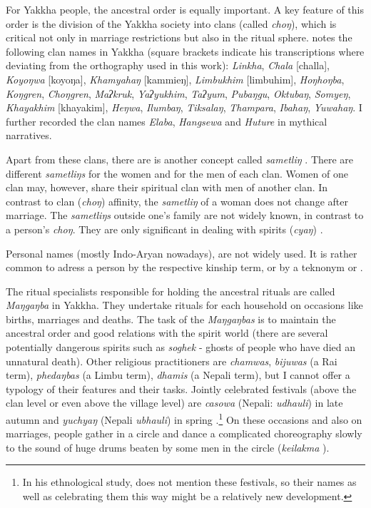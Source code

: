 For  Yakkha people, the ancestral order is equally important. A key feature of this order is the division of the Yakkha society into clans (called \emph{choŋ}), which is critical not only in marriage restrictions but also in the ritual sphere. \citet[201]{Russell1992_Yakha} notes the following clan names in Yakkha (square brackets indicate his transcriptions where deviating from the orthography used in this work): \emph{Linkha}, \emph{Chala} [challa], \emph{Koyoŋwa} [koyoŋa], \emph{Khamyahaŋ} [kammieŋ], \emph{Limbukhim} [limbuhim], \emph{Hoŋhoŋba}, \emph{Koŋgren}, \emph{Choŋgren}, \emph{Maʔkruk}, \emph{Yaʔyukhim}, \emph{Taʔyum}, \emph{Pubaŋgu}, \emph{Oktubaŋ}, \emph{Somyeŋ}, \emph{Khayakhim} [khayakim], \emph{Heŋwa}, \emph{Ilumbaŋ}, \emph{Tiksalaŋ}, \emph{Thampara}, \emph{Ibahaŋ}, \emph{Yuwahaŋ}. I further recorded the clan names \emph{Elaba}, \emph{Hangsewa} and \emph{Huture} in mythical narratives. 

Apart from these clans, there are is another concept called \emph{sametliŋ} . There are different  \emph{sametliŋs} for the women and for the men of each clan. Women of one clan may, however, share their spiritual clan with men of another clan. In contrast to clan  (\emph{choŋ}) affinity, the \emph{sametliŋ} of a woman does not change after marriage. The \emph{sametliŋs} outside one's family are not widely known, in contrast to a person's \emph{choŋ}. They are only significant in dealing with spirits (\emph{cyaŋ}) \citep[166]{Russell1992_Yakha}.

Personal names (mostly Indo-Aryan nowadays), are not widely used. It is rather common to adress a person by the respective kinship term, or by a teknonym  or . 

The ritual specialists responsible for holding the ancestral rituals are called \emph{Maŋgaŋba} in Yakkha. They undertake rituals for each household on occasions like births, marriages and deaths. The task of the \emph{Maŋgaŋbas} is to maintain the ancestral order and good relations with the spirit world (there are several potentially dangerous spirits such as \emph{soghek} - ghosts of people who have died an unnatural death). Other religious practitioners are \emph{chamwas},  \emph{bijuwas} (a Rai term), \emph{phedaŋbas} (a Limbu term), \emph{dhamis} (a Nepali term), but I cannot offer a typology of their features and their tasks. Jointly celebrated festivals (above the clan level or even above the village level) are \emph{casowa} (Nepali: \emph{udhauli}) in late autumn and \emph{yuchyaŋ} (Nepali \emph{ubhauli}) in spring \citep[102ff.]{Kongren2007Indigenous}.\footnote{In his ethnological study, \citet{Russell1992_Yakha}  does not mention these festivals, so their names as well as  celebrating them this way might be a relatively new development.} On these occasions and also on marriages, people gather in a circle and dance a complicated choreography slowly to the sound of huge drums beaten by some men in the circle (\emph{keilakma} ). 

